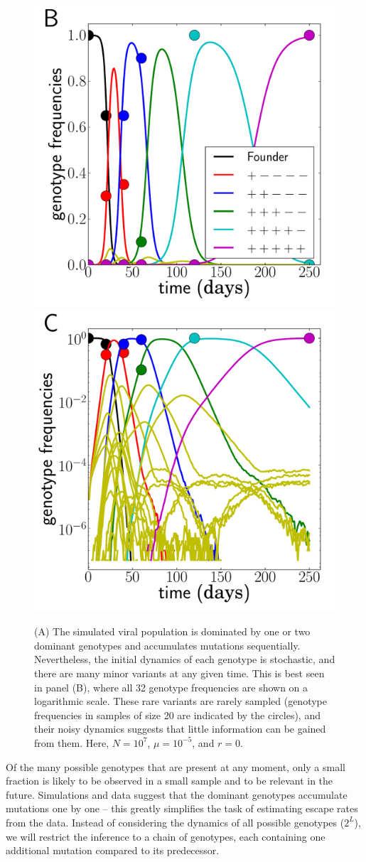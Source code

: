\documentclass{frontiers}
\begin{document}
\begin{figure}[tpb]
\begin{center}
  \includegraphics[width=0.24\columnwidth]{figures_manuscript/dominant_genotypes_demonstration.pdf}
  \includegraphics[width=0.24\columnwidth]{figures_manuscript/dominant_genotypes_demonstration_log.pdf}
  \caption[labelInTOC]{(A) The simulated viral population is dominated by one or two dominant
  genotypes and accumulates mutations sequentially. Nevertheless, the initial
  dynamics of each genotype is stochastic, and there are many minor variants at
  any given time. This is best seen in panel (B), where all 32 genotype
  frequencies are shown on a logarithmic scale. These rare variants are rarely
  sampled (genotype frequencies in samples of size 20 are indicated by the
  circles), and their noisy dynamics suggests that little information can be
  gained from them. Here,
$N = 10^7$, $\mu = 10^{-5}$, and $r = 0$.}
  \label{fig:example}
\end{center}
\end{figure}

Of the many possible genotypes that are present at any moment, only a small
fraction is likely to be observed in a small sample and to be relevant
in the future. Simulations and 
data suggest that the dominant genotypes accumulate mutations one by one -- this
greatly simplifies the task of estimating escape rates from the data. Instead of
considering the dynamics of all possible genotypes ($2^L$), we will restrict the 
inference to a
chain of genotypes, each containing one additional mutation compared to its
predecessor. 
\end{document}
